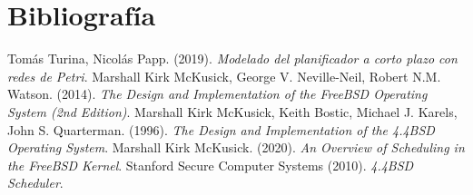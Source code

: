 \section{Bibliografía}

\begin{thebibliography}{9}
     Tomás Turina, Nicolás Papp. (2019). \textit{Modelado del planificador a corto plazo con redes de Petri}.
     Marshall Kirk McKusick, George V. Neville-Neil, Robert N.M. Watson. (2014). \textit{The Design and Implementation of the FreeBSD Operating System (2nd Edition)}.
     Marshall Kirk McKusick, Keith Bostic, Michael J. Karels, John S. Quarterman. (1996). \textit{The Design and Implementation of the 4.4BSD Operating System}.
     Marshall Kirk McKusick. (2020). \textit{An Overview of Scheduling in the FreeBSD Kernel}.
     Stanford Secure Computer Systems (2010). \textit{4.4BSD Scheduler}. %
\end{thebibliography}